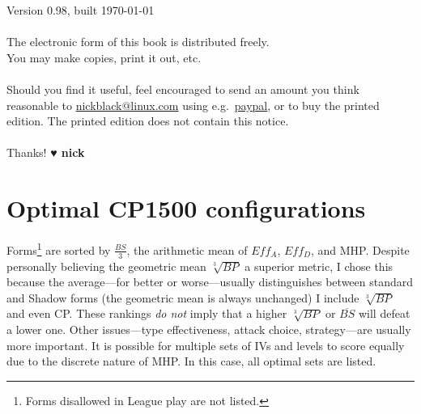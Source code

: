 \documentclass[ebook,10pt,openany,oneside]{memoir}
\begin{document}
\clearpage
\vfill
\noindent{}Version 0.98, built \today\\
\\
The electronic form of this book is distributed freely.\\
You may make copies, print it out, etc.\\
\\
Should you find it useful, feel encouraged to send an amount you think reasonable to
  \href{mailto:nickblack@linux.com}{nickblack@linux.com} using
  e.g.\ \href{https://paypal.me/dankamongmen}{paypal},
  or to buy the printed edition.
The printed edition does not contain this notice.\\
\\
Thanks! {\textbf{{\symbolfont♥} nick}}
\clearpage
\ifdefined\epub
\else
  \hypertarget{toc}{}%
  \tableofcontents*
  \hypertarget{lot}{}%
  \listoftables*
  \hypertarget{lof}{}%
  \listoffigures*
  \fi
{}

\mainmatter















\appendix
{}
\chapter{Optimal CP1500 configurations}
\label{chap:optimal}
Forms\footnote{Forms disallowed in League play are not listed.} are sorted by $\frac{BS}{3}$,
  the arithmetic mean of $Eff_A$, $Eff_D$, and MHP\@.
Despite personally believing the geometric mean $\sqrt[3]{BP}$ a superior metric,
  I chose this because the average---for better or worse---usually
  distinguishes between standard and Shadow forms (the geometric mean is always unchanged)
I include $\sqrt[3]{BP}$ and even CP\@.
These rankings \textit{do not} imply that a higher $\sqrt[3]{BP}$ or $\overline{BS}$
  will defeat a lower one.
Other issues---type effectiveness, attack choice, strategy---are usually more important.
It is possible for multiple sets of IVs and levels to score equally due to the discrete nature of MHP\@.
In this case, all optimal sets are listed.
\end{document}
